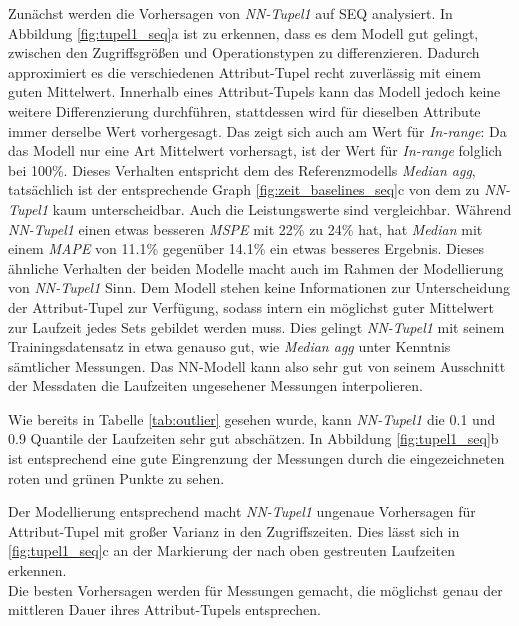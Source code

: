 \documentclass[
	twoside,
	12pt,
	a4paper,
	BCOR10mm,
	DIV14,
	listof=totoc,
	bibliography=totoc,
	headsepline
]{scrreprt}
\begin{document}
Zunächst werden die Vorhersagen von \textit{NN-Tupel1} auf SEQ analysiert.
In Abbildung \ref{fig:tupel1_seq}a ist zu erkennen, dass es dem Modell gut gelingt, zwischen den Zugriffsgrößen und Operationstypen zu differenzieren. Dadurch approximiert es die verschiedenen Attribut-Tupel recht zuverlässig mit einem guten Mittelwert.
Innerhalb eines Attribut-Tupels kann das Modell jedoch keine weitere Differenzierung durchführen, stattdessen wird für dieselben Attribute immer derselbe Wert vorhergesagt.
Das zeigt sich auch am Wert für \textit{In-range}: Da das Modell nur eine Art Mittelwert vorhersagt, ist der Wert für \textit{In-range} folglich bei 100\%.
Dieses Verhalten entspricht dem des Referenzmodells \textit{Median agg}, tatsächlich ist der entsprechende Graph \ref{fig:zeit_baselines_seq}c von dem zu \textit{NN-Tupel1} kaum unterscheidbar.
Auch die Leistungswerte sind vergleichbar. Während \textit{NN-Tupel1} einen etwas besseren \textit{MSPE} mit 22\% zu 24\% hat, hat \textit{Median} mit einem \textit{MAPE} von 11.1\% gegenüber 14.1\% ein etwas besseres Ergebnis. 
Dieses ähnliche Verhalten  der beiden Modelle macht auch im Rahmen der Modellierung von \textit{NN-Tupel1} Sinn.
Dem Modell stehen keine Informationen zur Unterscheidung der Attribut-Tupel zur Verfügung, sodass intern ein möglichst guter Mittelwert zur Laufzeit jedes Sets gebildet werden muss. Dies gelingt \textit{NN-Tupel1} mit seinem Trainingsdatensatz in etwa genauso gut, wie \textit{Median agg} unter Kenntnis sämtlicher Messungen. Das NN-Modell kann also sehr gut von seinem Ausschnitt der Messdaten die Laufzeiten ungesehener Messungen interpolieren.\medskip

Wie bereits in Tabelle \ref{tab:outlier} gesehen wurde, kann \textit{NN-Tupel1} die 0.1 und 0.9 Quantile der Laufzeiten sehr gut abschätzen.
In Abbildung \ref{fig:tupel1_seq}b ist entsprechend eine gute Eingrenzung der Messungen durch die eingezeichneten roten und grünen Punkte zu sehen.\medskip

Der Modellierung entsprechend macht \textit{NN-Tupel1} ungenaue Vorhersagen für Attribut-Tupel mit großer Varianz in den Zugriffszeiten. 
Dies lässt sich in \ref{fig:tupel1_seq}c an der Markierung der nach oben gestreuten Laufzeiten erkennen.\\
Die besten Vorhersagen werden für Messungen gemacht, die möglichst genau der mittleren Dauer ihres Attribut-Tupels entsprechen.\medskip
\end{document}
